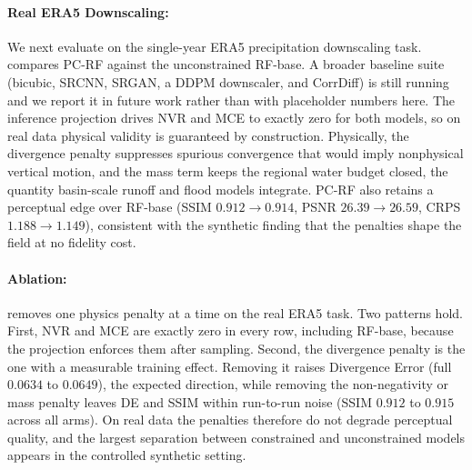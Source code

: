 \documentclass[letterpaper,withtimes]{easychair}
\newcommand{\pcrf}{\textsc{PC-RF}\xspace}
\begin{document}
\begin{table}[t]
\caption{Synthetic mechanism check (pure numpy, fixed seed). \emph{Not} ERA5 results. $\uparrow$ higher is better, $\downarrow$ lower is better.}
\label{tab:synthetic}
\centering
\small

\end{table}

\paragraph{Real ERA5 Downscaling:}
We next evaluate on the single-year ERA5 precipitation downscaling task.  compares \pcrf against the unconstrained RF-base. A broader baseline suite (bicubic, SRCNN, SRGAN, a DDPM downscaler, and CorrDiff) is still running and we report it in future work rather than with placeholder numbers here. The inference projection drives NVR and MCE to exactly zero for both models, so on real data physical validity is guaranteed by construction. Physically, the divergence penalty suppresses spurious convergence that would imply nonphysical vertical motion, and the mass term keeps the regional water budget closed, the quantity basin-scale runoff and flood models integrate. \pcrf also retains a perceptual edge over RF-base (SSIM $0.912\to0.914$, PSNR $26.39\to26.59$, CRPS $1.188\to1.149$), consistent with the synthetic finding that the penalties shape the field at no fidelity cost.

\begin{table}[t]
\caption{Real single-year ERA5 precipitation downscaling (one A100). NVR and MCE are exactly zero for both models because the inference projection enforces them. A broader baseline comparison is deferred to future work. Best in \textbf{bold}. $\uparrow$ higher is better, $\downarrow$ lower is better.}
\label{tab:era5}
\centering
\small

\end{table}

\paragraph{Ablation:}
 removes one physics penalty at a time on the real ERA5 task. Two patterns hold. First, NVR and MCE are exactly zero in every row, including RF-base, because the projection enforces them after sampling. Second, the divergence penalty is the one with a measurable training effect. Removing it raises Divergence Error (full $0.0634$ to $0.0649$), the expected direction, while removing the non-negativity or mass penalty leaves DE and SSIM within run-to-run noise (SSIM $0.912$ to $0.915$ across all arms). On real data the penalties therefore do not degrade perceptual quality, and the largest separation between constrained and unconstrained models appears in the controlled synthetic setting.
\end{document}
